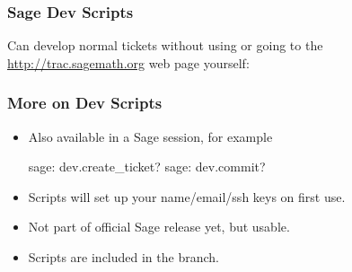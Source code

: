 
\begin{frame}[fragile]
  \frametitle{Sage Dev Scripts}

  Can develop normal tickets without using  or going to the
  \url{http://trac.sagemath.org} web page yourself:

\end{frame}


\begin{frame}[fragile]
  \frametitle{More on Dev Scripts}
  
  \begin{itemize}
  \item 
    Also available in a Sage session, for example
    \begin{shell}
      sage: dev.create_ticket?
      sage: dev.commit?
    \end{shell}
  \item Scripts will set up your name/email/ssh keys on first use.
  \item Not part of official Sage release yet, but usable.
  \item Scripts are included in the 
    branch.
  \end{itemize}
  
\end{frame}





